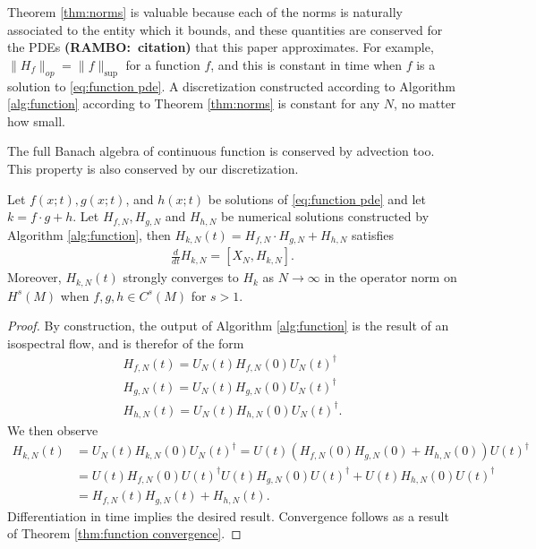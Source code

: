\documentclass[final,leqno]{siamltex1213}
\newcommand{\ram}[1]{{\normalsize{\textbf{({\color{red}RAMBO:\ }#1)}}}}
\begin{document}
Theorem \ref{thm:norms} is valuable because each of the norms is naturally associated to the entity which it bounds, and these quantities are conserved for the PDEs \ram{citation} that this paper approximates.
For example, $\| H_{f} \|_{op} = \| f \|_{\sup}$ for a function $f$, and this is constant in time when $f$ is a solution to \eqref{eq:function pde}.
A discretization constructed according to Algorithm \ref{alg:function} according to Theorem \ref{thm:norms} is constant for any $N$, no matter how small.

The full Banach algebra of continuous function is conserved by advection too.
This property is also conserved by our discretization.
\begin{theorem} \label{thm:algebra}
	Let $f(x;t),g(x;t)$, and $h(x;t)$ be solutions of \eqref{eq:function pde} and let $k= f \cdot g + h $.
	Let $H_{f,N}, H_{g,N}$ and $H_{h,N}$ be numerical solutions constructed by Algorithm \ref{alg:function}, then $H_{k,N}(t) = H_{f,N}\cdot H_{g,N}+H_{h,N}$
	satisfies
	\begin{align}
		\frac{d}{dt} H_{k,N} = [ X_{N} , H_{k,N}].
	\end{align}
	Moreover, $H_{k,N}(t)$ strongly converges to $H_{k}$ as $N \to \infty$ in the operator norm on $H^{s}(M)$ when $f,g,h \in C^{s}(M)$ for $s>1$.
\end{theorem}
\begin{proof}
	By construction, the output of Algorithm \ref{alg:function} is the result of an isospectral flow, and is therefor of the form 
	\begin{align}
		H_{f,N}(t) = U_{N}(t) H_{f,N}(0) U_{N}(t)^{\dagger} \\
		H_{g,N}(t) = U_{N}(t) H_{g,N}(0) U_{N}(t)^{\dagger} \\
		H_{h,N}(t) = U_{N}(t) H_{h,N}(0) U_{N}(t)^{\dagger}.
	\end{align}
	We then observe
	\begin{align}
		H_{k,N}(t) &= U_{N}(t) H_{k,N}(0) U_{N}(t)^{\dagger} = U(t)\left( H_{f,N}(0) H_{g,N}(0) + H_{h,N}(0) \right) U(t)^{\dagger} \\
			&= U(t)H_{f,N}(0) U(t)^{\dagger} U(t) H_{g,N}(0)U(t)^{\dagger} + U(t) H_{h,N}(0) U(t)^{\dagger} \\
			&=H_{f,N}(t)H_{g,N}(t) + H_{h,N}(t).
	\end{align}
	Differentiation in time implies the desired result.
	Convergence follows as a result of Theorem \ref{thm:function convergence}.
\end{proof}
\end{document}
